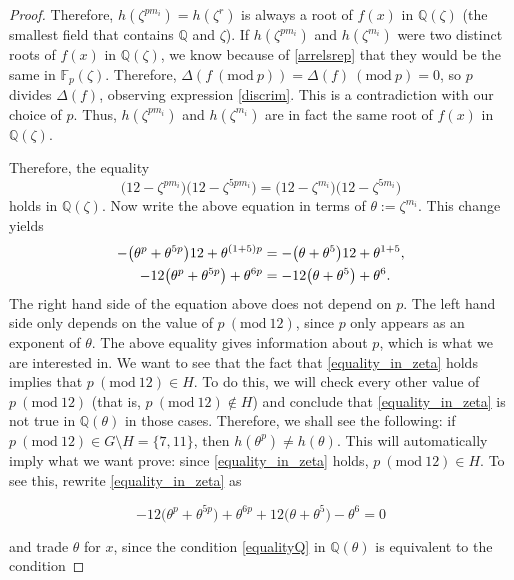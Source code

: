 \documentclass[a4paper, 12pt]{article}
\theoremstyle{definition}
\theoremstyle{remark}
\newcommand{\Q}{\ensuremath{\mathbb{Q}}}
\newcommand{\F}{\ensuremath{\mathbb{F}}}
\newcommand{\Mod}[1]{\ (\mathrm{mod}\ #1)} %
\begin{document}
\begin{proof}
Therefore, $h(\zeta^{pm_i})=h(\zeta^{r})$ is always a root of $f(x)$ in $\Q(\zeta)$ (the smallest field that contains $\Q$ and $\zeta$). If $h(\zeta^{pm_i})$ and $h(\zeta^{m_i})$ were two distinct roots of $f(x)$ in $\Q(\zeta)$, we know because of \eqref{arrelsrep} that they would be the same in $\F_p(\zeta)$. Therefore, $\Delta(f \Mod{p})=\Delta(f) \Mod{p}=0$, so $p$ divides $\Delta(f)$, observing expression \eqref{discrim}. This is a contradiction with our choice of $p$. Thus, $h(\zeta^{pm_i})$ and $h(\zeta^{m_i})$ are in fact the same root of $f(x)$ in $\Q(\zeta)$.

Therefore, the equality
\begin{equation*}
\big({12}-\zeta^{pm_i}\big)\big({12}-\zeta^{5pm_i}\big)=\big({12}-\zeta^{m_i}\big)\big({12}-\zeta^{5m_i}\big)
\end{equation*}
holds in $\Q(\zeta)$. Now write the above equation in terms of $\theta:=\zeta^{m_i}$. This change yields
\begin{align}
-\big(\theta^{p}+\theta^{5p}\big){12}+\theta^{(1+5)p}&=-\big(\theta+\theta^{5}\big){12}+\theta^{1+5}, \notag \\
-12\big(\theta^{p}+\theta^{5p}\big)+\theta^{6p}&=-12\big(\theta+\theta^{5}\big)+\theta^{6}\label{equality_in_zeta}.
\end{align}
The right hand side of the equation above does not depend on $p$. The left hand side only depends on the value of $p\Mod{12}$, since $p$ only appears as an exponent of $\theta$. The above equality gives information about $p$, which is what we are interested in. We want to see that the fact that \eqref{equality_in_zeta} holds implies that $p \Mod{12}\in H$. To do this, we will check every other value of $p \Mod{12}$ (that is, $p \Mod{12}\notin H$) and conclude that \eqref{equality_in_zeta} is not true in $\Q(\theta)$ in those cases. Therefore, we shall see the following: if $p \Mod{12}\in G\setminus H=\{7, 11\}$, then $h(\theta^p)\neq h(\theta)$. This will automatically imply what we want prove: since \eqref{equality_in_zeta} holds, $p \Mod{12}\in H$. To see this, rewrite \eqref{equality_in_zeta} as

\begin{equation}\label{equalityQ}
-12\big(\theta^{p}+\theta^{5p}\big)+\theta^{6p}+12\big(\theta+\theta^{5}\big)-\theta^{6}=0
\end{equation}

and trade $\theta$ for $x$, since the condition \eqref{equalityQ} in $\Q(\theta)$ is equivalent to the condition


\end{proof}
\end{document}
